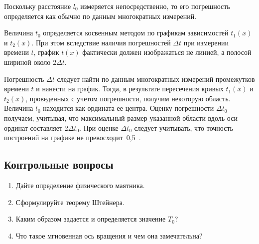 \documentclass[a4paper, 12pt]{extarticle}
\begin{document}
Поскольку расстояние $l_0$ измеряется непосредственно, то его погрешность определяется как обычно по данным многократных измерений.

Величина $t_0$ определяется косвенным методом по графикам зависимостей $t_1(x)$ и $t_2(x)$.  При этом вследствие наличия погрешностей $\Delta t$ при измерении времени $t$, график $t(x)$ фактически должен изображаться не линией, а полосой шириной около $2 \Delta t$. 

Погрешность $\Delta t$ следует найти по данным многократных измерений промежутков времени $t$ и нанести на график. Тогда, в результате пересечения  кривых $t_1(x)$ и $t_2(x)$, проведенных с учетом погрешности, получим некоторую область. Величина $t_0$ находится как ордината ее центра. Оценку погрешности $\Delta t_0$ получаем, учитывая, что максимальный размер указанной области вдоль оси ординат составляет $2 \Delta t_0$. При оценке $\Delta t_0$ следует учитывать, что точность построений на графике не превосходит~0,5~. 

\subsection{Контрольные вопросы}
\begin{enumerate}
\item Дайте определение физического маятника.
\item Сформулируйте теорему Штейнера.
\item Каким образом задается и определяется значение $T_0$?
\item Что такое мгновенная ось вращения и чем она замечательна?
\end{enumerate}
\end{document}
